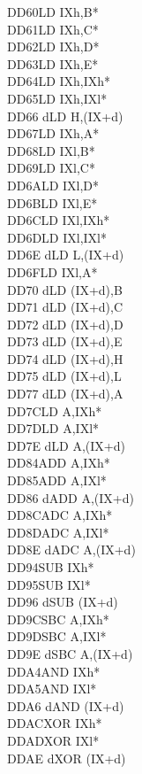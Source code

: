 \documentclass[oneside,a4paper]{book}
\begin{document}
\begin{multicols}{3}
{\begin{tabbing}
DD60\>LD IXh,B*\\
DD61\>LD IXh,C*\\
DD62\>LD IXh,D*\\
DD63\>LD IXh,E*\\
DD64\>LD IXh,IXh*\\
DD65\>LD IXh,IXl*\\
DD66 d\>LD H,(IX+d)\\
DD67\>LD IXh,A*\\
DD68\>LD IXl,B*\\
DD69\>LD IXl,C*\\
DD6A\>LD IXl,D*\\
DD6B\>LD IXl,E*\\
DD6C\>LD IXl,IXh*\\
DD6D\>LD IXl,IXl*\\
DD6E d\>LD L,(IX+d)\\
DD6F\>LD IXl,A*\\
DD70 d\>LD (IX+d),B\\
DD71 d\>LD (IX+d),C\\
DD72 d\>LD (IX+d),D\\
DD73 d\>LD (IX+d),E\\
DD74 d\>LD (IX+d),H\\
DD75 d\>LD (IX+d),L\\
DD77 d\>LD (IX+d),A\\
DD7C\>LD A,IXh*\\
DD7D\>LD A,IXl*\\
DD7E d\>LD A,(IX+d)\\
DD84\>ADD A,IXh*\\
DD85\>ADD A,IXl*\\
DD86 d\>ADD A,(IX+d)\\
DD8C\>ADC A,IXh*\\
DD8D\>ADC A,IXl*\\
DD8E d\>ADC A,(IX+d)\\
DD94\>SUB IXh*\\
DD95\>SUB IXl*\\
DD96 d\>SUB (IX+d)\\
DD9C\>SBC A,IXh*\\
DD9D\>SBC A,IXl*\\
DD9E d\>SBC A,(IX+d)\\
DDA4\>AND IXh*\\
DDA5\>AND IXl*\\
DDA6 d\>AND (IX+d)\\
DDAC\>XOR IXh*\\
DDAD\>XOR IXl*\\
DDAE d\>XOR (IX+d)\\

\end{tabbing}}
\end{multicols}
\end{document}
